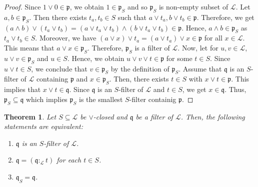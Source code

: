 \documentclass[preprint,review,10pt]{amsart}
\newtheorem{theorem}{Theorem}[section]
\theoremstyle{definition}
\theoremstyle{remark}
\numberwithin{equation}{section}
\begin{document}
\begin{proof}
Since  $1 \vee 0 \in \mathfrak{p}$, we obtain $1 \in \mathfrak{p}_S$ and so  $\mathfrak{p}_S$ is non-empty subset of $\mathscr{L}$. Let $a, b \in \mathfrak{p}_S $. Then there exists $t_a,t_b \in S$ such that $a \vee t_a, b \vee t_b \in  \mathfrak{p} $. Therefore, we get $(a \wedge b) \vee (t_a \vee t_b)=(a \vee  t_a \vee t_b) \wedge (b \vee t_a \vee t_b) \in \mathfrak{p}$. Hence, $a \wedge b \in \mathfrak{p}_S$ as $t_a \vee t_b \in S$. Moreover, we have  $(a \vee x) \vee  t_a =(a \vee t_a) \vee x \in \mathfrak{p}$ for all $x \in \mathscr{L}$. This means that $a \vee x \in \mathfrak{p}_S$. Therefore, $\mathfrak{p}_S$ is a filter of $\mathscr{L}$. Now, let for $u,v \in   \mathscr{L}$, $u \vee v \in \mathfrak{p}_S$ and $u \in S$. Hence, we obtain $u \vee v \vee t \in \mathfrak{p}$ for some $t \in S$. Since $u \vee t \in S$, we conclude that $v \in \mathfrak{p}_S$ by the definition of $\mathfrak{p}_S$. Assume that $\mathfrak{q}$ is an $S$-filter of $\mathscr{L}$ containing $\mathfrak{p}$ and $x \in \mathfrak{p}_S$. Then, there exists $t \in S$ with $x \vee t \in \mathfrak{p}$. This implies that $x  \vee t \in \mathfrak{q}$. Since $\mathfrak{q}$ is an $S$-filter of $\mathscr{L}$ and $t \in S$, we get $x \in \mathfrak{q}$. Thus,   $\mathfrak{p}_S \subseteq  \mathfrak{q}$ which implies $\mathfrak{p}_S$ is the smallest $S$-filter containig $\mathfrak{p}$.
\end{proof}
\begin{theorem} \label{ghasem}
Let $S \subseteq \mathscr{L}$ be   $\vee$-closed and $\mathfrak {q}$ be a filter of $\mathscr{L}$. Then, the following statements are equivalent:
\begin{enumerate}
\item $\mathfrak {q}$ is an $S$-filter of $\mathscr{L}$.
\item $\mathfrak {q}=(\mathfrak {q} :_{\mathscr{L}}t)$ for each $t \in S$.
\item $\mathfrak{q}_S=\mathfrak{q}$.
\end{enumerate}
\end{theorem}
\end{document}
